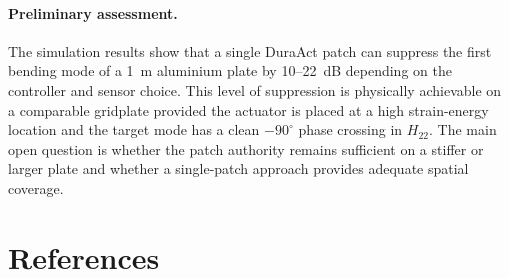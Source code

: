 \documentclass[12pt,a4paper]{article}
\begin{document}
\paragraph{Preliminary assessment.}
The simulation results show that a single DuraAct patch can suppress the first
bending mode of a 1~m aluminium plate by 10--22~dB depending on the controller
and sensor choice.  This level of suppression is physically achievable on a
comparable gridplate provided the actuator is placed at a high strain-energy
location and the target mode has a clean $-90^\circ$ phase crossing in $H_{22}$.
The main open question is whether the patch authority remains sufficient on a
stiffer or larger plate and whether a single-patch approach provides adequate
spatial coverage.

\section{References}
\end{document}
